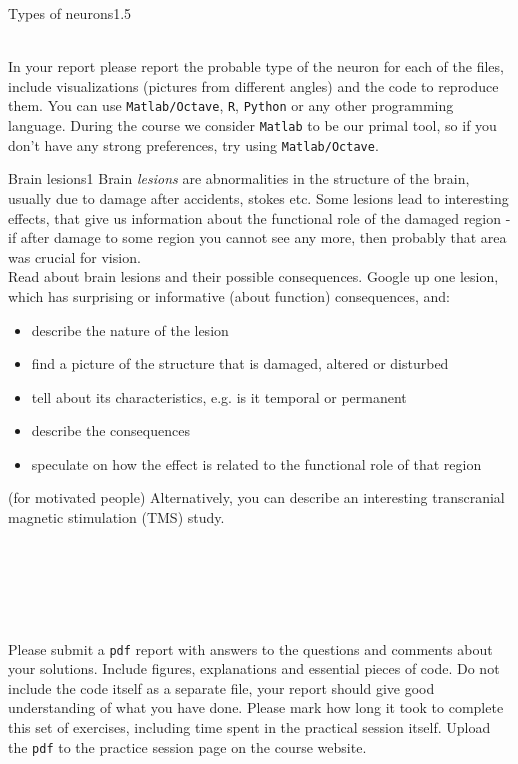 \documentclass[a4paper,11pt]{article}
\begin{document}
\begin{exercise}{3}{Types of neurons}{1.5}
\begin{enumerate}
\end{enumerate}
\ \\
In your report please report the probable type of the neuron for each of the files, include visualizations (pictures from different angles) and the code to reproduce them. You can use \texttt{Matlab/Octave}, \texttt{R}, \texttt{Python} or any other programming language. During the course we consider \texttt{Matlab} to be our primal tool, so if you don't have any strong preferences, try using \texttt{Matlab/Octave}.
\end{exercise}

%
%
\begin{exercise}{4}{Brain lesions}{1}
Brain \emph{lesions} are abnormalities in the structure of the brain, usually due to damage after accidents, stokes etc. Some lesions lead to interesting effects, that give us information about the functional role of the damaged region - if after damage to some region you cannot see any more, then probably that area was crucial for vision. \\
Read about brain lesions and their possible consequences. Google up one lesion, which has surprising or informative (about function) consequences, and:
\begin{itemize}
\itemsep 0em
	\item describe the nature of the lesion
	\item find a picture of the structure that is damaged, altered or disturbed
	\item tell about its characteristics, e.g. is it temporal or permanent
	\item describe the consequences
	\item speculate on how the effect is related to the functional role of that region
\end{itemize}
(for motivated people) Alternatively, you can describe an interesting transcranial magnetic stimulation (TMS) study.
\end{exercise}


\ \\
\ \\
\ \\
\ \\
\ \\
Please submit a \texttt{pdf} report with answers to the questions and comments about your solutions. Include figures, explanations and essential pieces of code. Do not include the code itself as a separate file, your report should give good understanding of what you have done. Please mark how long it took to complete this set of exercises, including time spent in the practical session itself. Upload the \texttt{pdf} to the practice session page on the course website.
\end{document}
